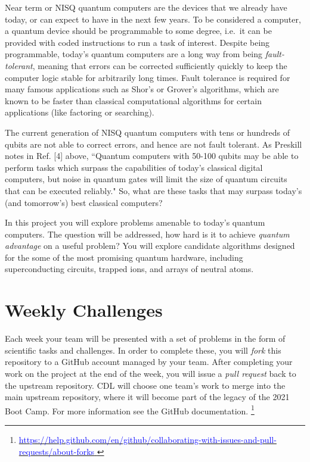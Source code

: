 \documentclass[12pt]{article}
\begin{document}
Near term or NISQ quantum computers are the devices that we already have today, or can expect to have in the next few years.
To be considered a computer, a quantum device should be programmable to some degree, 
i.e.~it can be provided with coded instructions to run a task of interest.
Despite being programmable, today's quantum computers are a long way from being {\it fault-tolerant}, meaning that errors can be corrected sufficiently
quickly to keep the computer logic stable for arbitrarily long times.  Fault tolerance is required for many famous applications such as 
Shor's or Grover's algorithms, which are known to be faster than classical computational algorithms for certain applications
(like factoring or searching).

The current generation of NISQ quantum computers with tens or hundreds of qubits are not able to correct errors, and hence are not fault tolerant.
As Preskill notes in Ref. [4] above, ``Quantum computers with 50-100 qubits may 
be able to perform tasks which surpass the capabilities of today's classical digital computers, but noise in quantum gates 
will limit the size of quantum circuits that can be executed reliably."  So, what are these tasks that may surpass today's (and tomorrow's)
best classical computers?  

In this project you will explore problems amenable to today's quantum computers.  The question will be addressed, 
how hard is it to achieve {\it quantum advantage} on a useful problem?
You will explore candidate algorithms designed for the some of the most promising quantum
hardware, including superconducting circuits, trapped ions, and arrays of neutral atoms.


\section{Weekly Challenges}

Each week your team will be presented with a set of problems in the form of scientific tasks and challenges.  In order to complete these, you will {\it fork} this repository to a GitHub account managed by your team.  After completing your work on the project at the end of the week, you will issue a {\it pull request} back to the upstream repository.
CDL will choose one team's work to merge into the main upstream repository, where it will become part of the legacy of the 2021 Boot Camp.  For more information see the
GitHub documentation.
\footnote{
    \href{https://help.github.com/en/github/collaborating-with-issues-and-pull-requests/about-forks}{\textcolor{blue}{https://help.github.com/en/github/collaborating-with-issues-and-pull-requests/about-forks} } }
\end{document}
